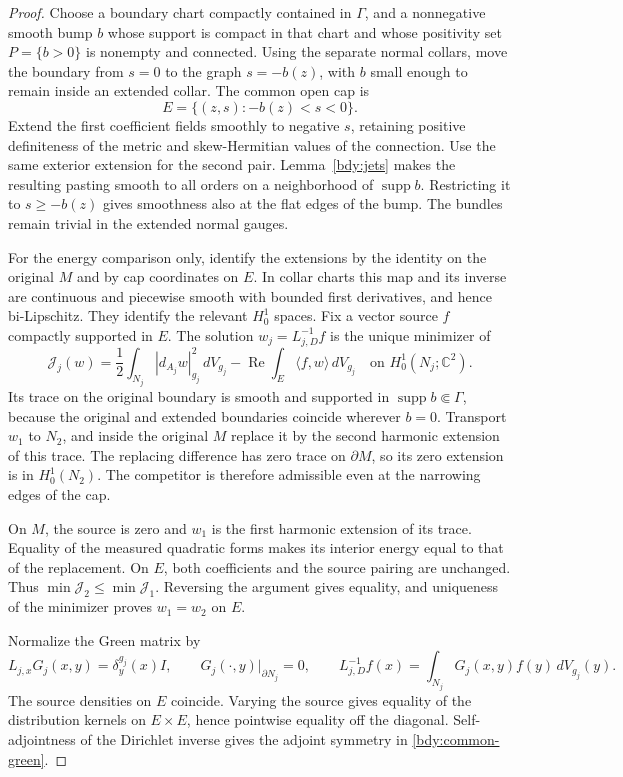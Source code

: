 \begin{proof}
Choose a boundary chart compactly contained in \(\Gamma\), and a
nonnegative smooth bump \(b\) whose support is compact in that chart
and whose positivity set \(P=\{b>0\}\) is nonempty and connected.
Using the separate normal collars, move the boundary from \(s=0\)
to the graph \(s=-b(z)\), with \(b\) small enough to remain inside
an extended collar.  The common open cap is
\[
                  E=\{(z,s):-b(z)<s<0\}.
\]
Extend the first coefficient fields smoothly to negative \(s\),
retaining positive definiteness of the metric and skew-Hermitian
values of the connection.  Use the same exterior extension for the
second pair.  Lemma~\ref{bdy:jets} makes the resulting pasting smooth
to all orders on a neighborhood of \(\operatorname{supp}b\).
Restricting it to \(s\ge-b(z)\) gives smoothness also at the flat
edges of the bump.  The bundles remain trivial in the extended
normal gauges.

For the energy comparison only, identify the extensions by the
identity on the original \(M\) and by cap coordinates on \(E\).
In collar charts this map and its inverse are continuous and
piecewise smooth with bounded first derivatives, and hence
bi-Lipschitz.  They identify the relevant \(H^1_0\) spaces.  Fix a
vector source \(f\) compactly supported in \(E\).  The solution
\(w_j=L_{j,D}^{-1}f\) is the unique minimizer of
\[
 \mathcal J_j(w)=\frac12\int_{N_j}|d_{A_j}w|_{g_j}^2\,dV_{g_j}
       -\operatorname{Re}\int_E\langle f,w\rangle\,dV_{g_j}
       \quad\text{on }H^1_0(N_j;\mathbb C^2).
\]
Its trace on the original boundary is smooth and supported in
\(\operatorname{supp}b\Subset\Gamma\), because the original and
extended boundaries coincide wherever \(b=0\).  Transport \(w_1\)
to \(N_2\), and inside the original \(M\) replace it by the
second harmonic extension of this trace.  The replacing difference
has zero trace on \(\partial M\), so its zero extension is in
\(H^1_0(N_2)\).  The competitor is therefore admissible even at the
narrowing edges of the cap.

On \(M\), the source is zero and \(w_1\) is the first harmonic
extension of its trace.  Equality of the measured quadratic forms
makes its interior energy equal to that of the replacement.  On
\(E\), both coefficients and the source pairing are unchanged.
Thus \(\min\mathcal J_2\le\min\mathcal J_1\).  Reversing the
argument gives equality, and uniqueness of the minimizer proves
\(w_1=w_2\) on \(E\).

Normalize the Green matrix by
\[
 L_{j,x}G_j(x,y)=\delta_y^{g_j}(x)I,\qquad
 G_j(\cdot,y)|_{\partial N_j}=0,\qquad
 L_{j,D}^{-1}f(x)=\int_{N_j}G_j(x,y)f(y)\,dV_{g_j}(y).
\]
The source densities on \(E\) coincide.  Varying the source gives
equality of the distribution kernels on \(E\times E\), hence
pointwise equality off the diagonal.  Self-adjointness of the
Dirichlet inverse gives the adjoint symmetry in
\eqref{bdy:common-green}.
\end{proof}


